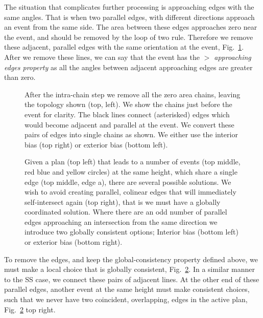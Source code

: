 The situation that complicates further processing is approaching edges with the same angles. That is when two parallel edges, with different directions approach an event from the same side. The area between these edges approaches zero near the event, and should be removed by the loop of two rule. Therefore we remove these adjacent, parallel edges with the same orientation at the event, Fig.~\ref{fig:wss_equal_approach_killer}. After we remove these lines, we can say that the event has the \emph{$>$ approaching edges property} as all the angles between adjacent approaching edges are greater than zero.

\begin{figure}
  \centering
  \def\svgwidth{1.0\columnwidth}
  
  \caption[Removing zero area chains]{\label{fig:wss_equal_approach_killer} After the intra-chain step we remove all the zero area chains, leaving the topology shown (top, left). We show the chains just before the event for clarity. The black lines connect (asterisked) edges which would become adjacent and parallel at the event. We convert these pairs of edges into single chains as shown. We either use the interior bias (top right) or exterior bias (bottom left). 
}
\end{figure}

\begin{figure}
  \centering
  \def\svgwidth{1.0\columnwidth}
  
  \caption[Global coordiation of a solution with parallel edges]{\label{fig:wss_linear_align} Given a plan (top left) that leads to a number of events (top middle, red blue and yellow circles) at the same height, which share a single edge (top middle, edge a), there are several possible solutions. We wish to avoid creating parallel, colinear edges that will immediately self-intersect again (top right), that is we must have a globally coordinated solution. Where there are an odd number of parallel edges approaching an intersection from the same direction we introduce two globally consistent options; Interior bias (bottom left) or exterior bias (bottom right).}
\end{figure}

To remove the edges, and keep the global-consistency property defined above, we must make a local choice that is globally consistent, Fig.~\ref{fig:wss_linear_align}. In a similar manner to the SS case, we connect these pairs of adjacent lines. At the other end of these parallel edges, another event at the same height must make consistent choices, such that we never have two coincident, overlapping, edges in the active plan, Fig.~\ref{fig:wss_linear_align} top right.

